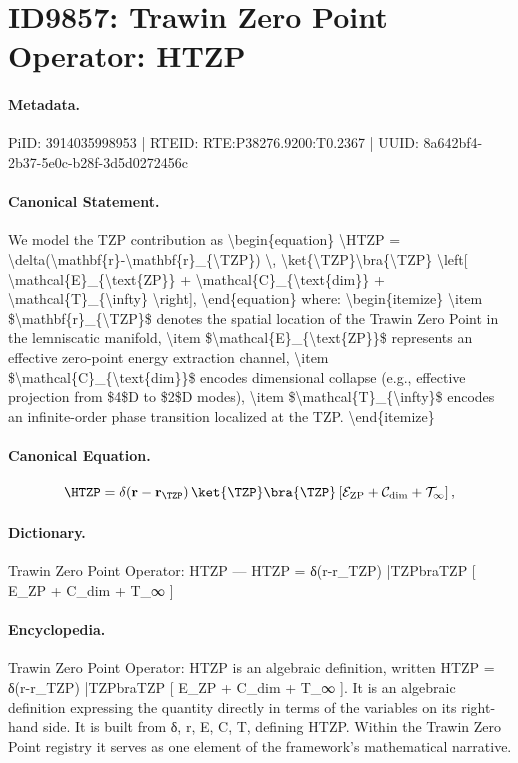 \section*{ID9857: Trawin Zero Point Operator: HTZP}
\paragraph{Metadata.}
PiID: 3914035998953 | RTEID: RTE:P38276.9200:T0.2367 | UUID: 8a642bf4-2b37-5e0c-b28f-3d5d0272456c

\paragraph{Canonical Statement.}
We model the TZP contribution as \textbackslash{}begin\{equation\} \textbackslash{}HTZP = \textbackslash{}delta(\textbackslash{}mathbf\{r\}-\textbackslash{}mathbf\{r\}\_\{\textbackslash{}TZP\}) \textbackslash{}, \textbackslash{}ket\{\textbackslash{}TZP\}\textbackslash{}bra\{\textbackslash{}TZP\} \textbackslash{}left[ \textbackslash{}mathcal\{E\}\_\{\textbackslash{}text\{ZP\}\} + \textbackslash{}mathcal\{C\}\_\{\textbackslash{}text\{dim\}\} + \textbackslash{}mathcal\{T\}\_\{\textbackslash{}infty\} \textbackslash{}right], \textbackslash{}end\{equation\} where: \textbackslash{}begin\{itemize\} \textbackslash{}item \$\textbackslash{}mathbf\{r\}\_\{\textbackslash{}TZP\}\$ denotes the spatial location of the Trawin Zero Point in the lemniscatic manifold, \textbackslash{}item \$\textbackslash{}mathcal\{E\}\_\{\textbackslash{}text\{ZP\}\}\$ represents an effective zero-point energy extraction channel, \textbackslash{}item \$\textbackslash{}mathcal\{C\}\_\{\textbackslash{}text\{dim\}\}\$ encodes dimensional collapse (e.g., effective projection from \$4\$D to \$2\$D modes), \textbackslash{}item \$\textbackslash{}mathcal\{T\}\_\{\textbackslash{}infty\}\$ encodes an infinite-order phase transition localized at the TZP. \textbackslash{}end\{itemize\}

\paragraph{Canonical Equation.}
\[
\HTZP = \delta(\mathbf{r}-\mathbf{r}_{\TZP}) \, \ket{\TZP}\bra{\TZP} \left[ \mathcal{E}_{\text{ZP}} + \mathcal{C}_{\text{dim}} + \mathcal{T}_{\infty} \right],
\]

\paragraph{Dictionary.}
Trawin Zero Point Operator: HTZP — HTZP = δ(r-r\_TZP) |TZPbraTZP [ E\_ZP + C\_dim + T\_∞ ]

\paragraph{Encyclopedia.}
Trawin Zero Point Operator: HTZP is an algebraic definition, written HTZP = δ(r-r\_TZP) |TZPbraTZP [ E\_ZP + C\_dim + T\_∞ ]. It is an algebraic definition expressing the quantity directly in terms of the variables on its right-hand side. It is built from δ, r, E, C, T, defining HTZP. Within the Trawin Zero Point registry it serves as one element of the framework's mathematical narrative.
